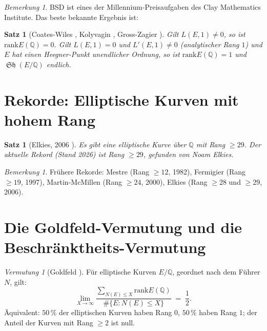 \documentclass[12pt,a4paper]{amsart}
\newtheorem{satz}[theorem]{Satz}
\theoremstyle{definition}
\theoremstyle{remark}
\newtheorem{bemerkung}[theorem]{Bemerkung}
\newtheorem{vermutung}[theorem]{Vermutung}
\newcommand{\Q}{\mathbb{Q}}
\DeclareMathOperator{\Sha}{\mathfrak{Sh}}
\newcommand{\rank}{\mathrm{rank}}
\begin{document}
\begin{bemerkung}
  BSD ist eines der Millennium-Preisaufgaben des Clay Mathematics Institute.
  Das beste bekannte Ergebnis ist:
\end{bemerkung}

\begin{satz}[Coates-Wiles \cite{CW1977}, Kolyvagin \cite{Kolyvagin1988},
  Gross-Zagier \cite{GZ1986}]
  Gilt $L(E,1) \neq 0$, so ist $\rank E(\Q) = 0$.
  Gilt $L(E,1) = 0$ und $L'(E,1) \neq 0$ (analytischer Rang $1$) und $E$ hat einen
  Heegner-Punkt unendlicher Ordnung, so ist $\rank E(\Q) = 1$ und $\Sha(E/\Q)$ endlich.
\end{satz}

\section{Rekorde: Elliptische Kurven mit hohem Rang}\label{sec:rekorde}

\begin{satz}[Elkies, 2006 \cite{Elkies2006}]
  Es gibt eine elliptische Kurve über $\Q$ mit Rang $\geq 29$.
  Der aktuelle Rekord (Stand 2026) ist Rang $\geq 29$, gefunden von Noam Elkies.
\end{satz}

\begin{bemerkung}
  Frühere Rekorde: Mestre \cite{Mestre1982} (Rang $\geq 12$, 1982),
  Fermigier (Rang $\geq 19$, 1997),
  Martin-McMillen (Rang $\geq 24$, 2000),
  Elkies (Rang $\geq 28$ und $\geq 29$, 2006).
\end{bemerkung}

\section{Die Goldfeld-Vermutung und die Beschränktheits-Vermutung}\label{sec:goldfeld}

\begin{vermutung}[Goldfeld \cite{Goldfeld1979}]\label{verm:goldfeld}
  Für elliptische Kurven $E/\Q$, geordnet nach dem Führer $N$, gilt:
  \[
    \lim_{X\to\infty} \frac{\sum_{N(E) \leq X} \rank E(\Q)}
                           {\#\{E : N(E) \leq X\}}
    \;=\; \frac{1}{2}.
  \]
  Äquivalent: $50\,\%$ der elliptischen Kurven haben Rang $0$, $50\,\%$ haben Rang $1$;
  der Anteil der Kurven mit Rang $\geq 2$ ist null.
\end{vermutung}
\end{document}

